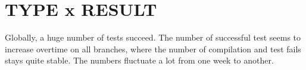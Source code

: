 \section{TYPE x RESULT}

Globally, a huge number of tests succeed. The number of successful test seems to increase overtime on all branches, where the number of compilation and test fails stays quite stable. The numbers fluctuate a lot from one week to another.

